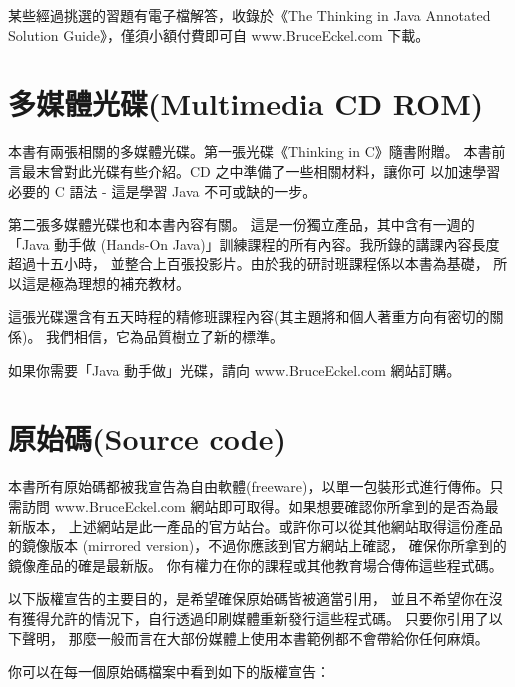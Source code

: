 某些經過挑選的習題有電子檔解答，收錄於《The Thinking in Java
Annotated Solution Guide》，僅須小額付費即可自 www.BruceEckel.com 下載。
\section{多媒體光碟(Multimedia CD ROM)}
本書有兩張相關的多媒體光碟。第一張光碟《Thinking in C》隨書附贈。
本書前言最末曾對此光碟有些介紹。CD 之中準備了一些相關材料，讓你可
以加速學習必要的 C 語法 - 這是學習 Java 不可或缺的一步。

第二張多媒體光碟也和本書內容有關。
這是一份獨立產品，其中含有一週的「Java 動手做
(Hands-On Java)」訓練課程的所有內容。我所錄的講課內容長度超過十五小時，
並整合上百張投影片。由於我的研討班課程係以本書為基礎，
所以這是極為理想的補充教材。

這張光碟還含有五天時程的精修班課程內容(其主題將和個人著重方向有密切的關係)。
我們相信，它為品質樹立了新的標準。

如果你需要「Java 動手做」光碟，請向 www.BruceEckel.com 網站訂購。
\section{原始碼(Source code)}
本書所有原始碼都被我宣告為自由軟體(freeware)，以單一包裝形式進行傳佈。只需訪問
www.BruceEckel.com 網站即可取得。如果想要確認你所拿到的是否為最新版本，
上述網站是此一產品的官方站台。或許你可以從其他網站取得這份產品的鏡像版本
(mirrored version)，不過你應該到官方網站上確認，
確保你所拿到的鏡像產品的確是最新版。
你有權力在你的課程或其他教育場合傳佈這些程式碼。

以下版權宣告的主要目的，是希望確保原始碼皆被適當引用，
並且不希望你在沒有獲得允許的情況下，自行透過印刷媒體重新發行這些程式碼。
只要你引用了以下聲明，
那麼一般而言在大部份媒體上使用本書範例都不會帶給你任何麻煩。

你可以在每一個原始碼檔案中看到如下的版權宣告：


